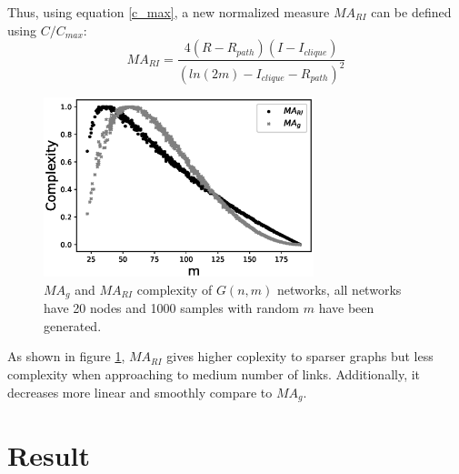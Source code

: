\documentclass[12pt]{article}
\begin{document}
\noindent
Thus, using equation \ref{c_max}, a new normalized measure $MA_{RI}$ can be defined using $C/C_{max}$:\\
\begin{equation}
    MA_{RI} = \frac{4(R-R_{path})(I-I_{clique})}{(ln(2m)-I_{clique}-R_{path})^2}
\end{equation}
\begin{figure}[h]
    \centering
    \includegraphics[width=0.7\textwidth]{mariandmag.eps}
    \caption{$MA_g$ and $MA_{RI}$ complexity of $G(n,m)$ networks, all networks have 20 nodes and 1000 samples with random $m$ have been generated.}
    \label{fig:marimagcompare}
\end{figure}
\par
As shown in figure \ref{fig:marimagcompare}, $MA_{RI}$ gives higher coplexity to sparser graphs but less complexity when approaching to medium number of links. Additionally, it decreases more linear and smoothly compare to $MA_g$.

\section{Result}
\end{document}
